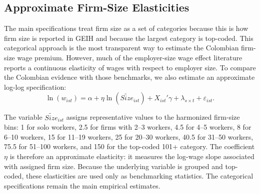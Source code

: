 \subsection{Approximate Firm-Size Elasticities}

The main specifications treat firm size as a set of categories because this is
how firm size is reported in GEIH and because the largest category is top-coded.
This categorical approach is the most transparent way to estimate the Colombian
firm-size wage premium. However, much of the employer-size wage effect
literature reports a continuous elasticity of wages with respect to employer
size. To compare the Colombian evidence with those benchmarks, we also estimate
an approximate log-log specification:
\begin{equation}\label{eq:elasticity}
  \ln(w_{ist}) =
  \alpha
  + \eta \ln(\widetilde{Size}_{ist})
  + X_{ist}'\gamma
  + \lambda_{s \times t}
  + \varepsilon_{ist}.
\end{equation}

The variable \(\widetilde{Size}_{ist}\) assigns representative values to the
harmonized firm-size bins: 1 for solo workers, 2.5 for firms with 2--3 workers,
4.5 for 4--5 workers, 8 for 6--10 workers, 15 for 11--19 workers, 25 for
20--30 workers, 40.5 for 31--50 workers, 75.5 for 51--100 workers, and 150 for
the top-coded 101+ category. The coefficient \(\eta\) is therefore an
approximate elasticity: it measures the log-wage slope associated with assigned
firm size. Because the underlying variable is grouped and top-coded, these
elasticities are used only as benchmarking statistics. The categorical
specifications remain the main empirical estimates.
